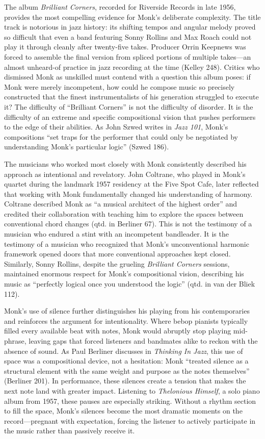 \documentclass[12pt]{article}
\begin{document}
The album \textit{Brilliant Corners}, recorded for Riverside Records in late 1956, provides the most compelling evidence for Monk's deliberate complexity. The title track is notorious in jazz history: its shifting tempos and angular melody proved so difficult that even a band featuring Sonny Rollins and Max Roach could not play it through cleanly after twenty-five takes. Producer Orrin Keepnews was forced to assemble the final version from spliced portions of multiple takes---an almost unheard-of practice in jazz recording at the time (Kelley 248). Critics who dismissed Monk as unskilled must contend with a question this album poses: if Monk were merely incompetent, how could he compose music so precisely constructed that the finest instrumentalists of his generation struggled to execute it? The difficulty of ``Brilliant Corners'' is not the difficulty of disorder. It is the difficulty of an extreme and specific compositional vision that pushes performers to the edge of their abilities. As John Szwed writes in \textit{Jazz 101}, Monk's compositions ``set traps for the performer that could only be negotiated by understanding Monk's particular logic'' (Szwed 186).

The musicians who worked most closely with Monk consistently described his approach as intentional and revelatory. John Coltrane, who played in Monk's quartet during the landmark 1957 residency at the Five Spot Cafe, later reflected that working with Monk fundamentally changed his understanding of harmony. Coltrane described Monk as ``a musical architect of the highest order'' and credited their collaboration with teaching him to explore the spaces between conventional chord changes (qtd. in Berliner 67). This is not the testimony of a musician who endured a stint with an incompetent bandleader. It is the testimony of a musician who recognized that Monk's unconventional harmonic framework opened doors that more conventional approaches kept closed. Similarly, Sonny Rollins, despite the grueling \textit{Brilliant Corners} sessions, maintained enormous respect for Monk's compositional vision, describing his music as ``perfectly logical once you understood the logic'' (qtd. in van der Bliek 112).

Monk's use of silence further distinguishes his playing from his contemporaries and reinforces the argument for intentionality. Where bebop pianists typically filled every available beat with notes, Monk would abruptly stop playing mid-phrase, leaving gaps that forced listeners and bandmates alike to reckon with the absence of sound. As Paul Berliner discusses in \textit{Thinking In Jazz}, this use of space was a compositional device, not a hesitation: Monk ``treated silence as a structural element with the same weight and purpose as the notes themselves'' (Berliner 201). In performance, these silences create a tension that makes the next note land with greater impact. Listening to \textit{Thelonious Himself}, a solo piano album from 1957, these pauses are especially striking. Without a rhythm section to fill the space, Monk's silences become the most dramatic moments on the record---pregnant with expectation, forcing the listener to actively participate in the music rather than passively receive it.
\end{document}
